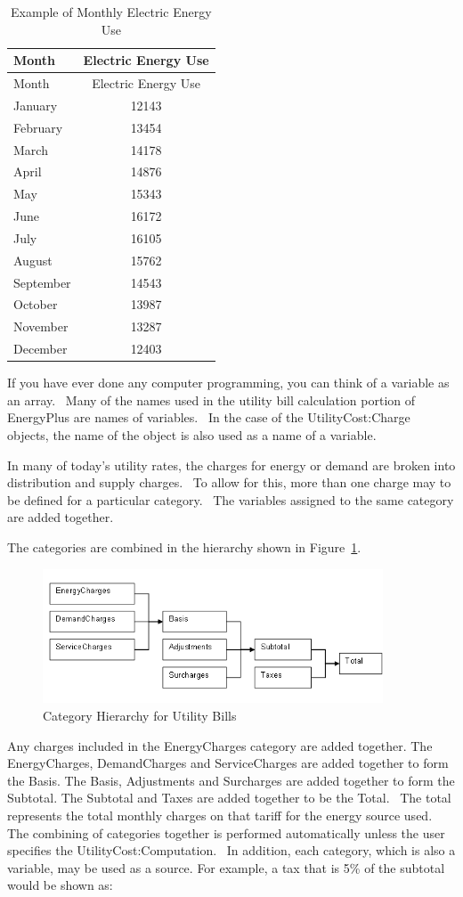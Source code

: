 \begin{longtable}[c]{@{}lc@{}}
\caption{Example of Monthly Electric Energy Use \label{table:example-monthly-electric-energy-use}} \tabularnewline
\toprule 
Month & Electric Energy Use \tabularnewline
\midrule
\endfirsthead

\toprule 
Month & Electric Energy Use \tabularnewline
\midrule
\endhead

January & 12143 \tabularnewline
February & 13454 \tabularnewline
March & 14178 \tabularnewline
April & 14876 \tabularnewline
May & 15343 \tabularnewline
June & 16172 \tabularnewline
July & 16105 \tabularnewline
August & 15762 \tabularnewline
September & 14543 \tabularnewline
October & 13987 \tabularnewline
November & 13287 \tabularnewline
December & 12403 \tabularnewline
\bottomrule
\end{longtable}

If you have ever done any computer programming, you can think of a variable as an array.~ Many of the names used in the utility bill calculation portion of EnergyPlus are names of variables.~ In the case of the UtilityCost:Charge objects, the name of the object is also used as a name of a variable.

In many of today's utility rates, the charges for energy or demand are broken into distribution and supply charges.~ To allow for this, more than one charge may to be defined for a particular category.~ The variables assigned to the same category are added together.

The categories are combined in the hierarchy shown in Figure~\ref{fig:category-hierarchy}.


\begin{figure}[hbtp]
\centering
\includegraphics[width=0.9\textwidth, height=0.9\textheight, keepaspectratio=true]{media/image7909.png}
\caption{Category Hierarchy for Utility Bills \label{fig:category-hierarchy}}
\end{figure}

Any charges included in the EnergyCharges category are added together. The EnergyCharges, DemandCharges and ServiceCharges are added together to form the Basis. The Basis, Adjustments and Surcharges are added together to form the Subtotal. The Subtotal and Taxes are added together to be the Total.~ The total represents the total monthly charges on that tariff for the energy source used.~ The combining of categories together is performed automatically unless the user specifies the UtilityCost:Computation.~ In addition, each category, which is also a variable, may be used as a source. For example, a tax that is 5\% of the subtotal would be shown as:

